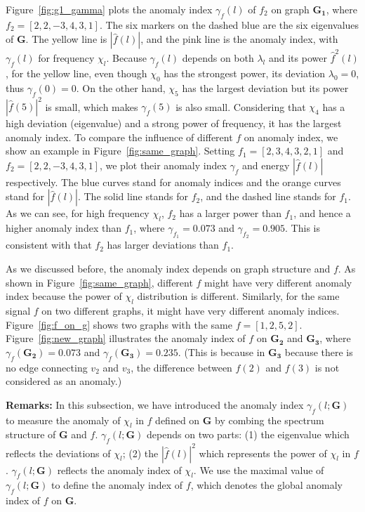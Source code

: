 Figure~\ref{fig:g1_gamma} plots the anomaly index $\gamma_f(l)$ of $f_2$ on graph $\mathbf{G_1}$, where $f_2=[2,2,-3,4,3,1]$. The six markers on the dashed blue are the six eigenvalues of $\mathbf{G}$. The yellow line is $|\hat{f}(l)|$, and the pink line is the anomaly index, with $\gamma_f(l)$ for frequency $\chi_l$. Because $\gamma_f(l)$ depends on both $\lambda_l$ and its power $\hat{f}^2(l)$, for the yellow line, even though $\chi_0$ has the strongest power, its deviation $\lambda_0 = 0$, thus $\gamma_f(0)=0$. On the other hand, $\chi_5$ has the largest deviation but its power $|\hat{f}(5)|^2$ is small, which makes $\gamma_f(5)$ is also small. Considering that $\chi_4$ has a high deviation (eigenvalue) and a strong power of frequency, it has the largest anomaly index. To compare the influence of different $f$ on anomaly index, we show an example in Figure~\ref{fig:same_graph}. Setting $f_1=[2,3,4,3,2,1]$ and $f_2=[2,2,-3,4,3,1]$, we plot their anomaly index $\gamma_{f}$ and energy $|\hat{f}(l)|$ respectively.
The blue curves stand for anomaly indices and the
orange curves stand for $|\hat{f}(l)|$. The solid line stands for $f_2$, and the
dashed line stands for $f_1$. As we can see, for high frequency $\chi_l$, $f_2$ has a larger power than $f_1$, and hence a higher anomaly index than $f_1$, where $\gamma_{f_1}=0.073$ and $\gamma_{f_2}=0.905$. This is consistent with that $f_2$ has larger deviations than $f_1$.

As we discussed before, the anomaly index depends on graph structure and $f$. As shown in Figure~\ref{fig:same_graph}, different $f$ might have very different anomaly index because the power of $\chi_l$ distribution is different. Similarly, for the same signal $f$ on two different graphs, it might have very different anomaly indices. Figure~\ref{fig:f_on_g} shows two graphs with the same $f=[1,2,5,2]$. Figure~\ref{fig:new_graph} illustrates the anomaly index of $f$ on $\mathbf{G_2}$ and $\mathbf{G_3}$, where $\gamma_{f}(\mathbf{G_2})=0.073$ and $\gamma_{f}(\mathbf{G_3})=0.235$. (This is because in $\mathbf{G_3}$ because there is no edge connecting $v_2$ and $v_3$, the difference between $f(2)$ and $f(3)$ is not considered as an anomaly.)


{\textbf{Remarks:}}
In this subsection, we have introduced the anomaly index $\gamma_f(l;\mathbf{G})$ to measure the anomaly of $\chi_l$ in $f$ defined on $\mathbf{G}$ by combing the spectrum structure of $\mathbf{G}$ and $f$. $\gamma_f(l;\mathbf{G})$ depends on two parts: (1) the eigenvalue which reflects the deviations of $\chi_l$; (2) the $|\hat{f}(l)|^2$  which represents the power of $\chi_l$ in $f$. $\gamma_f(l;\mathbf{G})$ reflects the anomaly index of $\chi_l$. We use the maximal value of $\gamma_f(l;\mathbf{G})$ to define the anomaly index of $f$, which denotes the global anomaly index of $f$ on $\mathbf{G}$.



